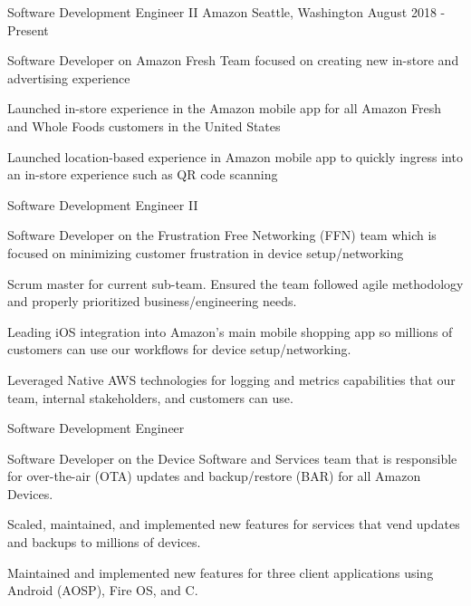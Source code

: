 \documentclass[
    changecolor={96, 52, 177},
]{peter-resume}
\begin{document}
\pagestyle{empty} %

\cventry
  {Software Development Engineer II}
  {Amazon}
  {Seattle, Washington}
  {August 2018 - Present}
  {
    \begin{cvitems}
      \item {Software Developer on Amazon Fresh Team focused on creating new in-store and advertising experience}
      \item {Launched in-store experience in the Amazon mobile app for all Amazon Fresh and Whole Foods customers in the United States}
      \item {Launched location-based experience in Amazon mobile app to quickly ingress into an in-store experience such as QR code scanning}
    \end{cvitems}
  }
\cventry
  {Software Development Engineer II}
  {}
  {}
  {}
  {
    \begin{cvitems}
      \item {Software Developer on the Frustration Free Networking (FFN) team which is focused on minimizing customer frustration in device setup/networking}
      \item {Scrum master for current sub-team. Ensured the team followed agile methodology and properly prioritized business/engineering needs.}
      \item {Leading iOS integration into Amazon's main mobile shopping app so millions of customers can use our workflows for device setup/networking.}
      \item {Leveraged Native AWS technologies for logging and metrics capabilities that our team, internal stakeholders, and customers can use.}
    \end{cvitems}
  }
\cventry
  {Software Development Engineer}
  {}
  {}
  {}
  {
    \begin{cvitems}
      \item {Software Developer on the Device Software and Services team that is responsible for over-the-air (OTA) updates and backup/restore (BAR) for all Amazon Devices.}
      \item {Scaled, maintained, and implemented new features for services that vend updates and backups to millions of devices.}
      \item {Maintained and implemented new features for three client applications using Android (AOSP), Fire OS, and C.}
    \end{cvitems}
  }
\end{document}

